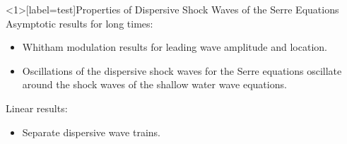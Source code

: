 \documentclass[pdf]{beamer}
\begin{document}
\begin{frame}<1>[label=test]{Properties of Dispersive Shock Waves of the Serre Equations}
	Asymptotic results for long times:
	\begin{itemize}
		\item Whitham modulation results for leading wave amplitude and location. \pause
		\item Oscillations of the dispersive shock waves for the Serre equations oscillate around the shock waves of the shallow water wave equations. \newline 
		\pause
	\end{itemize}
	Linear results:
		\begin{itemize}
			\item Separate dispersive wave trains.
		\end{itemize}
\end{frame}
\end{document}
